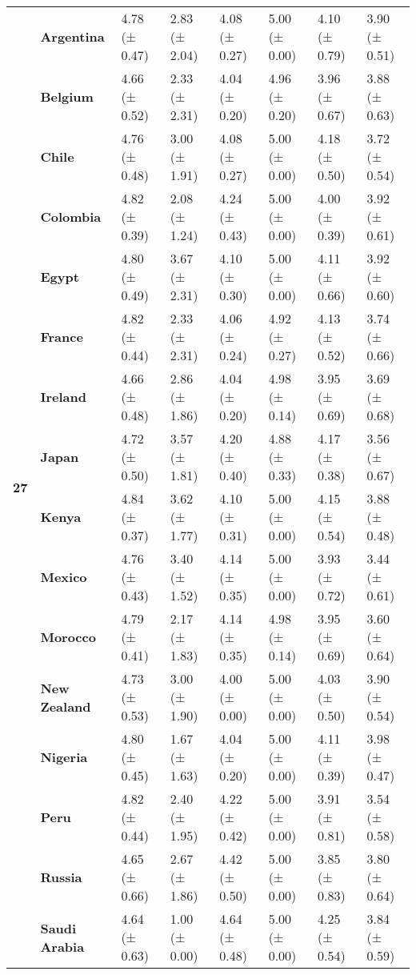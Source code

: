 \begin{tabular}{llllllll}
\cline{1-8}
\multirow[t]{19}{*}{\textbf{27}} & \textbf{Argentina} & 4.78 (± 0.47) & 2.83 (± 2.04) & 4.08 (± 0.27) & 5.00 (± 0.00) & 4.10 (± 0.79) & 3.90 (± 0.51) \\
\textbf{} & \textbf{Belgium} & 4.66 (± 0.52) & 2.33 (± 2.31) & 4.04 (± 0.20) & 4.96 (± 0.20) & 3.96 (± 0.67) & 3.88 (± 0.63) \\
\textbf{} & \textbf{Chile} & 4.76 (± 0.48) & 3.00 (± 1.91) & 4.08 (± 0.27) & 5.00 (± 0.00) & 4.18 (± 0.50) & 3.72 (± 0.54) \\
\textbf{} & \textbf{Colombia} & 4.82 (± 0.39) & 2.08 (± 1.24) & 4.24 (± 0.43) & 5.00 (± 0.00) & 4.00 (± 0.39) & 3.92 (± 0.61) \\
\textbf{} & \textbf{Egypt} & 4.80 (± 0.49) & 3.67 (± 2.31) & 4.10 (± 0.30) & 5.00 (± 0.00) & 4.11 (± 0.66) & 3.92 (± 0.60) \\
\textbf{} & \textbf{France} & 4.82 (± 0.44) & 2.33 (± 2.31) & 4.06 (± 0.24) & 4.92 (± 0.27) & 4.13 (± 0.52) & 3.74 (± 0.66) \\
\textbf{} & \textbf{Ireland} & 4.66 (± 0.48) & 2.86 (± 1.86) & 4.04 (± 0.20) & 4.98 (± 0.14) & 3.95 (± 0.69) & 3.69 (± 0.68) \\
\textbf{} & \textbf{Japan} & 4.72 (± 0.50) & 3.57 (± 1.81) & 4.20 (± 0.40) & 4.88 (± 0.33) & 4.17 (± 0.38) & 3.56 (± 0.67) \\
\textbf{} & \textbf{Kenya} & 4.84 (± 0.37) & 3.62 (± 1.77) & 4.10 (± 0.31) & 5.00 (± 0.00) & 4.15 (± 0.54) & 3.88 (± 0.48) \\
\textbf{} & \textbf{Mexico} & 4.76 (± 0.43) & 3.40 (± 1.52) & 4.14 (± 0.35) & 5.00 (± 0.00) & 3.93 (± 0.72) & 3.44 (± 0.61) \\
\textbf{} & \textbf{Morocco} & 4.79 (± 0.41) & 2.17 (± 1.83) & 4.14 (± 0.35) & 4.98 (± 0.14) & 3.95 (± 0.69) & 3.60 (± 0.64) \\
\textbf{} & \textbf{New Zealand} & 4.73 (± 0.53) & 3.00 (± 1.90) & 4.00 (± 0.00) & 5.00 (± 0.00) & 4.03 (± 0.50) & 3.90 (± 0.54) \\
\textbf{} & \textbf{Nigeria} & 4.80 (± 0.45) & 1.67 (± 1.63) & 4.04 (± 0.20) & 5.00 (± 0.00) & 4.11 (± 0.39) & 3.98 (± 0.47) \\
\textbf{} & \textbf{Peru} & 4.82 (± 0.44) & 2.40 (± 1.95) & 4.22 (± 0.42) & 5.00 (± 0.00) & 3.91 (± 0.81) & 3.54 (± 0.58) \\
\textbf{} & \textbf{Russia} & 4.65 (± 0.66) & 2.67 (± 1.86) & 4.42 (± 0.50) & 5.00 (± 0.00) & 3.85 (± 0.83) & 3.80 (± 0.64) \\
\textbf{} & \textbf{Saudi Arabia} & 4.64 (± 0.63) & 1.00 (± 0.00) & 4.64 (± 0.48) & 5.00 (± 0.00) & 4.25 (± 0.54) & 3.84 (± 0.59) \\

\end{tabular}
